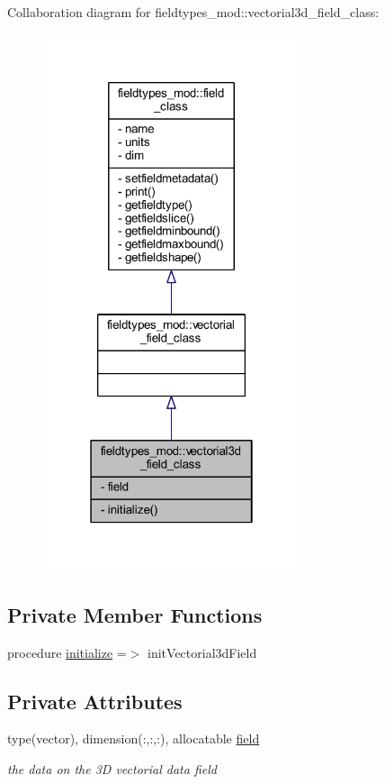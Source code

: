 Collaboration diagram for fieldtypes\+\_\+mod\+:\+:vectorial3d\+\_\+field\+\_\+class\+:\nopagebreak
\begin{figure}[H]
\begin{center}
\leavevmode
\includegraphics[width=214pt]{structfieldtypes__mod_1_1vectorial3d__field__class__coll__graph}
\end{center}
\end{figure}
\subsection*{Private Member Functions}
\begin{DoxyCompactItemize}
\item 
procedure \mbox{\hyperlink{structfieldtypes__mod_1_1vectorial3d__field__class_afcbe58623943107dfed2db8166cb4abe}{initialize}} =$>$ init\+Vectorial3d\+Field
\end{DoxyCompactItemize}
\subsection*{Private Attributes}
\begin{DoxyCompactItemize}
\item 
type(vector), dimension(\+:,\+:,\+:), allocatable \mbox{\hyperlink{structfieldtypes__mod_1_1vectorial3d__field__class_a28f999baeb22a378a3714363ae1143b0}{field}}
\begin{DoxyCompactList}\small\item\em the data on the 3D vectorial data field \end{DoxyCompactList}\end{DoxyCompactItemize}


